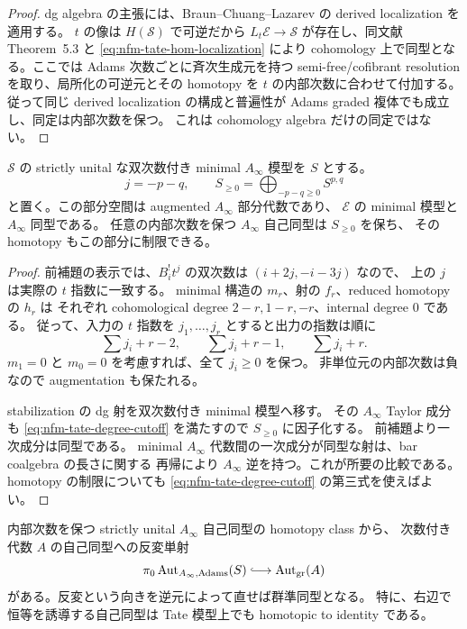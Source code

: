 \begin{proof}
dg algebra の主張には、Braun--Chuang--Lazarev の derived localization
\cite[Theorems~3.18 and~5.3]{NFMBCLLocalization} を適用する。
$t$ の像は $H(\mathcal S)$ で可逆だから
$L_t\mathcal E\to\mathcal S$ が存在し、同文献 Theorem~5.3 と \eqref{eq:nfm-tate-hom-localization} により
cohomology 上で同型となる。ここでは Adams 次数ごとに斉次生成元を持つ
semi-free/cofibrant resolution を取り、局所化の可逆元とその homotopy を
$t$ の内部次数に合わせて付加する。従って同じ derived localization の構成と普遍性が
Adams graded 複体でも成立し、同定は内部次数を保つ。
これは cohomology algebra だけの同定ではない。
\end{proof}

\begin{lemma}
\label{lem:nfm-ordinary-ext-intrinsic-cut}
$\mathcal S$ の strictly unital な双次数付き minimal $A_\infty$ 模型を $S$ とする。
\[
 j=-p-q,\qquad
 S_{\ge0}=\bigoplus_{-p-q\ge0}S^{p,q}
\]
と置く。この部分空間は augmented $A_\infty$ 部分代数であり、
$\mathcal E$ の minimal 模型と $A_\infty$ 同型である。
任意の内部次数を保つ $A_\infty$ 自己同型は $S_{\ge0}$ を保ち、
その homotopy もこの部分に制限できる。
\end{lemma}

\begin{proof}
前補題の表示では、$B^!_i t^j$ の双次数は $(i+2j,-i-3j)$ なので、
上の $j$ は実際の $t$ 指数に一致する。
minimal 構造の $m_r$、射の $f_r$、reduced homotopy の $h_r$ は
それぞれ cohomological degree $2-r,1-r,-r$、internal degree $0$ である。
従って、入力の $t$ 指数を $j_1,\ldots,j_r$ とすると出力の指数は順に
\begin{equation}\label{eq:nfm-tate-degree-cutoff}
\sum j_i+r-2,\qquad \sum j_i+r-1,\qquad \sum j_i+r.
\end{equation}
$m_1=0$ と $m_0=0$ を考慮すれば、全て $j_i\ge0$ を保つ。
非単位元の内部次数は負なので augmentation も保たれる。

stabilization の dg 射を双次数付き minimal 模型へ移す。
その $A_\infty$ Taylor 成分も \eqref{eq:nfm-tate-degree-cutoff} を満たすので $S_{\ge0}$ に因子化する。
前補題より一次成分は同型である。
minimal $A_\infty$ 代数間の一次成分が同型な射は、bar coalgebra の長さに関する
再帰により $A_\infty$ 逆を持つ。これが所要の比較である。
homotopy の制限についても \eqref{eq:nfm-tate-degree-cutoff} の第三式を使えばよい。
\end{proof}

\begin{proposition}
\label{prop:nfm-tate-automorphism-faithful}
内部次数を保つ strictly unital $A_\infty$ 自己同型の homotopy class から、
次数付き代数 $A$ の自己同型への反変単射
\begin{equation}\label{eq:nfm-tate-automorphism-restriction}
\pi_0\operatorname{Aut}_{A_\infty,\mathrm{Adams}}(S)
 \lhook\joinrel\longrightarrow\operatorname{Aut}_{\mathrm{gr}}(A)
\end{equation}
がある。反変という向きを逆元によって直せば群準同型となる。
特に、右辺で恒等を誘導する自己同型は Tate 模型上でも homotopic to identity である。
\end{proposition}

